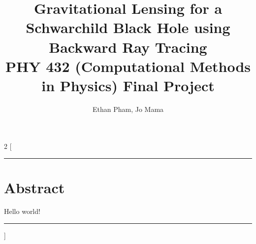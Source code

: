 \documentclass{article}
\title{Gravitational Lensing for a Schwarchild Black Hole using Backward Ray Tracing\\[5pt] \small PHY 432 (Computational Methods in Physics) Final Project}
\author{Ethan Pham, Jo Mama}
\date{}
\numberwithin{equation}{section}
\begin{document}
\maketitle
\thispagestyle{ttl}
\begin{multicols}{2}
[\hrule
	\section*{Abstract}
	Hello world!
\vspace*{5pt}
\hrule]
\end{multicols}
\end{document}
